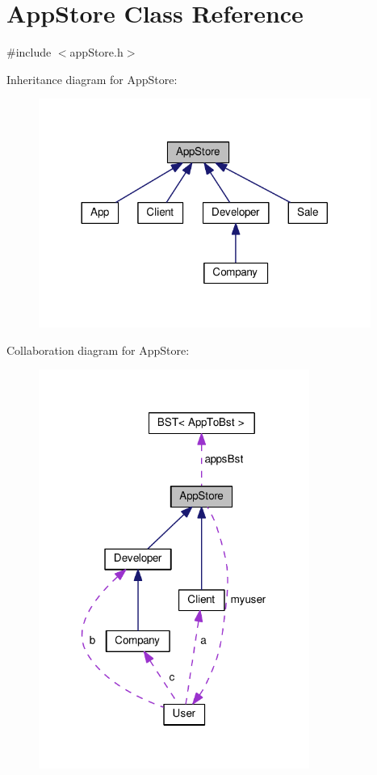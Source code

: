 \hypertarget{class_app_store}{\section{App\-Store Class Reference}
\label{class_app_store}
}


{\ttfamily \#include $<$app\-Store.\-h$>$}



Inheritance diagram for App\-Store\-:
\nopagebreak
\begin{figure}[H]
\begin{center}
\leavevmode
\includegraphics[width=308pt]{class_app_store__inherit__graph}
\end{center}
\end{figure}


Collaboration diagram for App\-Store\-:
\nopagebreak
\begin{figure}[H]
\begin{center}
\leavevmode
\includegraphics[width=251pt]{class_app_store__coll__graph}
\end{center}
\end{figure}

